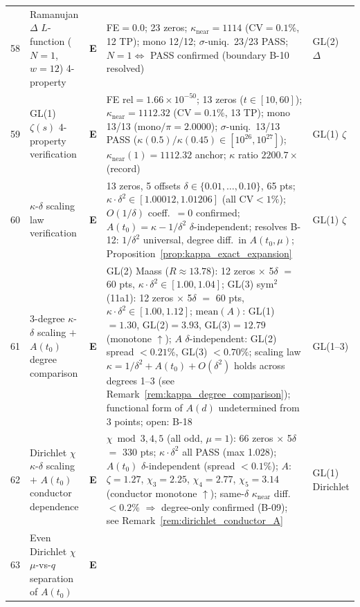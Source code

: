 \documentclass[11pt, a4paper]{article}
\theoremstyle{definition}
\theoremstyle{plain}
\begin{document}
\begin{center}
\begin{longtable}{@{}r l l p{4.2cm} l@{}}
58 & Ramanujan $\Delta$ $L$-function ($N{=}1$, $w{=}12$) 4-property & \textbf{E} & FE${}=0.0$; 23 zeros; $\kappa_{\mathrm{near}}{=}1114$ (CV${=}0.1\%$, 12 TP); mono 12/12; $\sigma$-uniq.\ 23/23 PASS; $N{=}1 \Leftrightarrow$ PASS confirmed (boundary B-10 resolved) & GL(2) $\Delta$ \\
59 & GL(1) $\zeta(s)$ 4-property verification & \textbf{E} & FE rel${=}1.66\times10^{-50}$; 13 zeros ($t{\in}[10,60]$); $\kappa_{\mathrm{near}}{=}1112.32$ (CV${=}0.1\%$, 13 TP); mono 13/13 ($\mathrm{mono}/\pi{=}2.0000$); $\sigma$-uniq.\ 13/13 PASS ($\kappa(0.5)/\kappa(0.45){\in}[10^{26},10^{27}]$); $\kappa_{\mathrm{near}}(1){=}1112.32$ anchor; $\kappa$ ratio $2200.7{\times}$ (record) & GL(1) $\zeta$ \\
60 & $\kappa$-$\delta$ scaling law verification & \textbf{E} & 13 zeros, 5 offsets $\delta{\in}\{0.01,\ldots,0.10\}$, 65 pts; $\kappa{\cdot}\delta^2{\in}[1.00012,1.01206]$ (all CV${<}1\%$); $O(1/\delta)$ coeff.\ ${=}0$ confirmed; $A(t_0){=}\kappa{-}1/\delta^2$ $\delta$-independent; resolves B-12: $1/\delta^2$ universal, degree diff.\ in $A(t_0,\mu)$; Proposition~\ref{prop:kappa_exact_expansion} & GL(1) $\zeta$ \\
\midrule
61 & 3-degree $\kappa$-$\delta$ scaling $+$ $A(t_0)$ degree comparison & \textbf{E} &
   GL(2) Maass ($R{\approx}13.78$): 12 zeros $\times$ 5$\delta$ $=$ 60 pts, $\kappa{\cdot}\delta^2{\in}[1.00,1.04]$;
   GL(3) sym$^2$(11a1): 12 zeros $\times$ 5$\delta$ $=$ 60 pts, $\kappa{\cdot}\delta^2{\in}[1.00,1.12]$;
   $\mathrm{mean}(A)$: GL(1)${=}1.30$, GL(2)${=}3.93$, GL(3)${=}12.79$ (monotone $\uparrow$);
   $A$ $\delta$-independent: GL(2) spread ${<}0.21\%$, GL(3) ${<}0.70\%$;
   scaling law $\kappa{=}1/\delta^2{+}A(t_0){+}O(\delta^2)$ holds across degrees 1--3
   (see Remark~\ref{rem:kappa_degree_comparison});
   functional form of $A(d)$ undetermined from 3 points; open: B-18
   & GL(1--3) \\
\midrule
62 & Dirichlet $\chi$ $\kappa$-$\delta$ scaling $+$ $A(t_0)$ conductor dependence & \textbf{E} &
   $\chi\bmod 3,4,5$ (all odd, $\mu{=}1$): 66 zeros $\times$ 5$\delta$ $=$ 330 pts;
   $\kappa{\cdot}\delta^2$ all PASS (max 1.028);
   $A(t_0)$ $\delta$-independent (spread ${<}0.1\%$);
   $A$: $\zeta{=}1.27$, $\chi_3{=}2.25$, $\chi_4{=}2.77$, $\chi_5{=}3.14$ (conductor monotone $\uparrow$);
   same-$\delta$ $\kappa_{\mathrm{near}}$ diff.\ ${<}0.2\%$ $\Rightarrow$ degree-only confirmed (B-09);
   see Remark~\ref{rem:dirichlet_conductor_A}
   & GL(1) Dirichlet \\
\midrule
63 & Even Dirichlet $\chi$ $\mu$-vs-$q$ separation of $A(t_0)$ & \textbf{E} &

\end{longtable}
\end{center}
\end{document}
